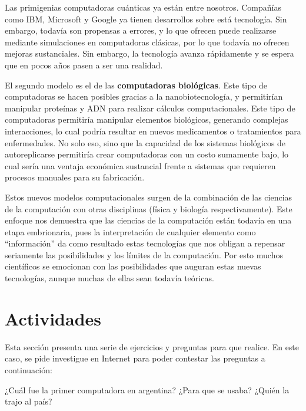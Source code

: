 Las primigenias computadoras cuánticas ya están entre nosotros. Compañías como
IBM, Microsoft y Google ya tienen desarrollos sobre está tecnología. Sin
embargo, todavía son propensas a errores, y lo que ofrecen puede realizarse
mediante simulaciones en computadoras clásicas, por lo que todavía no ofrecen
mejoras sustanciales. Sin embargo, la tecnología avanza rápidamente y se espera
que en pocos años pasen a ser una realidad.\autocite{mit_tech_2018_02}

El segundo modelo es el de las \textbf{computadoras biológicas}. Este tipo de
computadoras se hacen posibles gracias a la nanobiotecnología, y permitirían
manipular proteínas y ADN para realizar cálculos computacionales. Este tipo de
computadoras permitiría manipular elementos biológicos, generando complejas
interacciones, lo cual podría resultar en nuevos medicamentos o tratamientos
para enfermedades.\autocite{freitas_1999} No solo eso, sino que la capacidad de
los sistemas biológicos de autoreplicarse permitiría crear computadoras con un
costo sumamente bajo, lo cual sería una ventaja económica sustancial frente a
sistemas que requieren procesos manuales para su fabricación.

Estos nuevos modelos computacionales surgen de la combinación de las ciencias de
la computación con otras disciplinas (física y biología respectivamente). Este
enfoque nos demuestra que las ciencias de la computación están todavía en una
etapa embrionaria, pues la interpretación de cualquier elemento como
``información'' da como resultado estas tecnologías que nos obligan a repensar
seriamente las posibilidades y los límites de la computación. Por esto muchos
científicos se emocionan con las posibilidades que auguran estas nuevas
tecnologías, aunque muchas de ellas sean todavía teóricas.

\section{Actividades}
\label{chap:historia_computadoras:subsec:actividades}

Esta sección presenta una serie de ejercicios y preguntas para que realice. En
este caso, se pide investigue en Internet para poder contestar las preguntas a
continuación:

\begin{exercise}
¿Cuál fue la primer computadora en argentina? ¿Para que se usaba? ¿Quién la
trajo al país?
\end{exercise}


